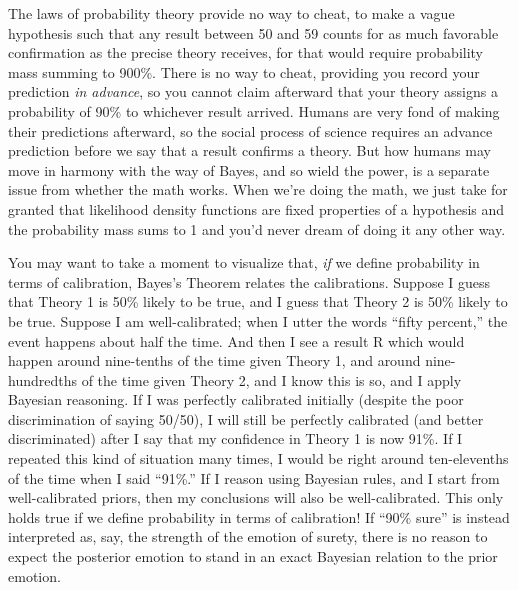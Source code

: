 {
 The laws of probability theory provide no way to cheat, to make a
vague hypothesis such that any result between 50 and 59 counts for as
much favorable confirmation as the precise theory receives, for that
would require probability mass summing to 900\%. There is no way to
cheat, providing you record your prediction \textit{in advance}, so you
cannot claim afterward that your theory assigns a probability of 90\%
to whichever result arrived. Humans are very fond of making their
predictions afterward, so the social process of science requires an
advance prediction before we say that a result confirms a theory. But
how humans may move in harmony with the way of Bayes, and so wield the
power, is a separate issue from whether the math works. When
we're doing the math, we just take for granted that
likelihood density functions are fixed properties of a hypothesis and
the probability mass sums to 1 and you'd never dream of
doing it any other way.}

{
 You may want to take a moment to visualize that, \textit{if} we
define probability in terms of calibration, Bayes's
Theorem relates the calibrations. Suppose I guess that Theory 1 is 50\%
likely to be true, and I guess that Theory 2 is 50\% likely to be true.
Suppose I am well-calibrated; when I utter the words
``fifty percent,'' the event happens
about half the time. And then I see a result R which would happen
around nine-tenths of the time given Theory 1, and around
nine-hundredths of the time given Theory 2, and I know this is so, and
I apply Bayesian reasoning. If I was perfectly calibrated initially
(despite the poor discrimination of saying 50/50), I will still be
perfectly calibrated (and better discriminated) after I say that my
confidence in Theory 1 is now 91\%. If I repeated this kind of
situation many times, I would be right around ten-elevenths of the time
when I said ``91\%.'' If I reason
using Bayesian rules, and I start from well-calibrated priors, then my
conclusions will also be well-calibrated. This only holds true if we
define probability in terms of calibration! If ``90\%
sure'' is instead interpreted as, say, the strength
of the emotion of surety, there is no reason to expect the posterior
emotion to stand in an exact Bayesian relation to the prior emotion.}

